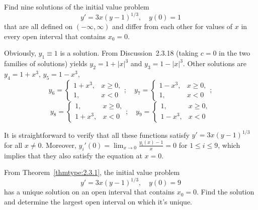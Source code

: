 \documentclass{ximera}
\begin{document}
\begin{problem}\label{exer:2.3.18}
Find nine solutions of the initial value problem
$$
y'=3x(y-1)^{1/3}, \quad y(0)=1
$$
that are all defined on $(-\infty,\infty)$ and differ from each other
for values of  $x$ in every open interval that contains $x_0=0$.



\begin{solution}
    Obviously, $y_1\equiv1$ is a solution.
From Discussion~2.3.18 (taking $c=0$
in the two families of solutions) yields
$y_2=1+|x|^3$ and $y_3=1-|x|^3$. Other solutions are
$y_4=1+x^3$, $y_5=1-x^3$,
$$
y_6=\left\{\begin{array}{ccl}1+x^3,&x\geq 0,\\
1,&x<0\end{array}\right.;\quad
y_7=\left\{\begin{array}{ccl}1-x^3,&x\geq 0,\\
1,&x<0\end{array}\right.;
$$
$$
y_8=\left\{\begin{array}{ccl}1,&x\geq 0,\\
1+x^3,&x<0\end{array}\right.;\quad
y_9=\left\{\begin{array}{ccl}1,&x\geq 0,\\
1-x^3,&x<0\end{array}\right.
$$


It is straightforward to verify that all these functions satisfy
$y'=3x(y-1)^{1/3}$  for all $x\ne0$. Moreover,
 $y_i'(0)=\lim_{x\to0}\frac{y_i(x)-1}{x}=0$ for
$1\leq i\leq 9$, which implies that they also satisfy the equation at
$x=0$.
\end{solution}
\end{problem}

\begin{problem}\label{exer:2.3.19}  From Theorem~\ref{thmtype:2.3.1}, the initial value problem
 $$
y'=3x(y-1)^{1/3}, \quad y(0)=9
$$
has a unique solution on an open interval that contains  $x_0=0$. Find the
solution and determine the largest open interval on which it's unique.
\end{problem}
\end{document}
